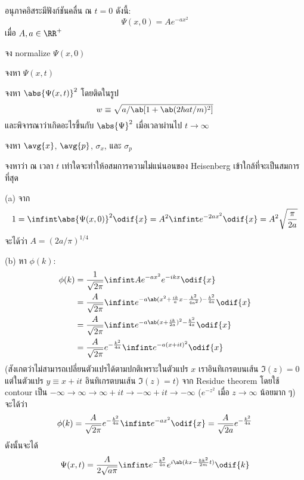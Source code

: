 \begin{exbox}
    อนุภาคอิสระมีฟังก์ชันคลื่น ณ $t = 0$ ดังนี้:
    \begin{equation}
        \Psi(x, 0) = Ae^{-ax^2} \tag{$\star$}
    \end{equation}
    เมื่อ $A, a \in \RR^+$
    \begin{compactenum}[label=(\alph*)]
        \item จง normalize $\Psi(x, 0)$
        \item จงหา $\Psi(x, t)$
        \item จงหา $\abs{\Psi(x, t)}^2$ โดยติดในรูป
        \[
            w \equiv \sqrt{a/\ab[1 + \ab(2\hbar at/m)^2]}
        \]
        และพิจารณาว่าเกิดอะไรขึ้นกับ $\abs{\Psi}^2$ เมื่อเวลาผ่านไป $t\to\infty$
        \item จงหา $\avg{x}$, $\avg{p}$, $\sigma_x$, และ $\sigma_p$
        \item จงหาว่า ณ เวลา $t$ เท่าใดจะทำให้อสมการความไม่แน่นอนของ Heisenberg เข้าใกล้ที่จะเป็นสมการที่สุด
    \end{compactenum}
\end{exbox}
\begin{soln}
    (a) จาก
    \[
        1 = \infint \abs{\Psi(x, 0)}^2 \odif{x} = A^2 \infint e^{-2ax^2}\odif{x} = A^2 \sqrt{\frac{\pi}{2a}}
    \]
    จะได้ว่า $A = (2a/\pi)^{1/4}$
    
    (b) หา $\phi(k)$:
    \begin{align*}
        \phi(k) &= \frac{1}{\sqrt{2\pi}} \infint Ae^{-ax^2}e^{-ikx}\odif{x} \\
        &= \frac{A}{\sqrt{2\pi}} \infint e^{-a\ab(x^2 + \frac{ik}{a}x - \frac{k^2}{4a^2}) - \frac{k^2}{4a}} \odif{x} \\
        &= \frac{A}{\sqrt{2\pi}} \infint e^{-a\ab(x + \frac{ik}{2a})^2 - \frac{k^2}{4a}} \odif{x} \\
        &= \frac{A}{\sqrt{2\pi}} e^{-\frac{k^2}{4a}} \infint e^{-a(x + it)^2} \odif{x}
    \end{align*}
    (สังเกตว่าไม่สามารถเปลี่ยนตัวแปรได้ตามปกติเพราะในตัวแปร $x$ เราอินทิเกรตบนเส้น $\Im(z) = 0$ แต่ในตัวแปร $y \equiv x + it$ อินทิเกรตบนเส้น $\Im(z) = t$) จาก Residue theorem โดยใช้ contour เป็น $-\infty \to \infty \to \infty + it \to -\infty + it \to -\infty$ ($e^{-z^2}$ เมื่อ $z\to\infty$ น้อยมาก ๆ) จะได้ว่า
    \[
        \phi(k) = \frac{A}{\sqrt{2\pi}} e^{-\frac{k^2}{4a}} \infint e^{-ax^2}\odif{x} = \frac{A}{\sqrt{2a}} e^{-\frac{k^2}{4a}}
    \]
    ดังนั้นจะได้
    \[
        \Psi(x, t) = \frac{A}{2\sqrt{a\pi}} \infint e^{-\frac{k^2}{4a}} e^{i\ab(kx - \frac{\hbar k^2}{2m}t)} \odif{k}
    \]
\end{soln}